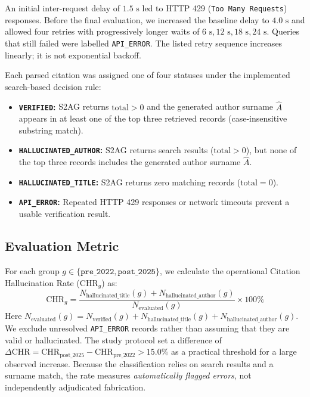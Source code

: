 \documentclass[manuscript,screen]{acmart}
\begin{document}
An initial inter-request delay of $1.5\text{ s}$ led to HTTP 429 (\texttt{Too Many Requests}) responses. Before the final evaluation, we increased the baseline delay to $4.0\text{ s}$ and allowed four retries with progressively longer waits of $6\text{ s}, 12\text{ s}, 18\text{ s}, 24\text{ s}$. Queries that still failed were labelled \texttt{API\_ERROR}. The listed retry sequence increases linearly; it is not exponential backoff.

Each parsed citation was assigned one of four statuses under the implemented search-based decision rule:
\begin{itemize}
    \item \textbf{\texttt{VERIFIED}:} S2AG returns $\text{total} > 0$ and the generated author surname $\hat{A}$ appears in at least one of the top three retrieved records (case-insensitive substring match).
    \item \textbf{\texttt{HALLUCINATED\_AUTHOR}:} S2AG returns search results ($\text{total} > 0$), but none of the top three records includes the generated author surname $\hat{A}$.
    \item \textbf{\texttt{HALLUCINATED\_TITLE}:} S2AG returns zero matching records ($\text{total} = 0$).
    \item \textbf{\texttt{API\_ERROR}:} Repeated HTTP 429 responses or network timeouts prevent a usable verification result.
\end{itemize}

\subsection{Evaluation Metric}
For each group $g \in \{\texttt{pre\_2022}, \texttt{post\_2025}\}$, we calculate the operational Citation Hallucination Rate ($\text{CHR}_g$) as:
\begin{equation}
\text{CHR}_g = \frac{N_{\text{hallucinated\_title}}(g) + N_{\text{hallucinated\_author}}(g)}{N_{\text{evaluated}}(g)} \times 100\%
\end{equation}
Here $N_{\text{evaluated}}(g) = N_{\text{verified}}(g) + N_{\text{hallucinated\_title}}(g) + N_{\text{hallucinated\_author}}(g)$. We exclude unresolved \texttt{API\_ERROR} records rather than assuming that they are valid or hallucinated. The study protocol set a difference of $\Delta \text{CHR} = \text{CHR}_{\text{post\_2025}} - \text{CHR}_{\text{pre\_2022}} > 15.0\%$ as a practical threshold for a large observed increase. Because the classification relies on search results and a surname match, the rate measures \textit{automatically flagged errors}, not independently adjudicated fabrication.
\end{document}
